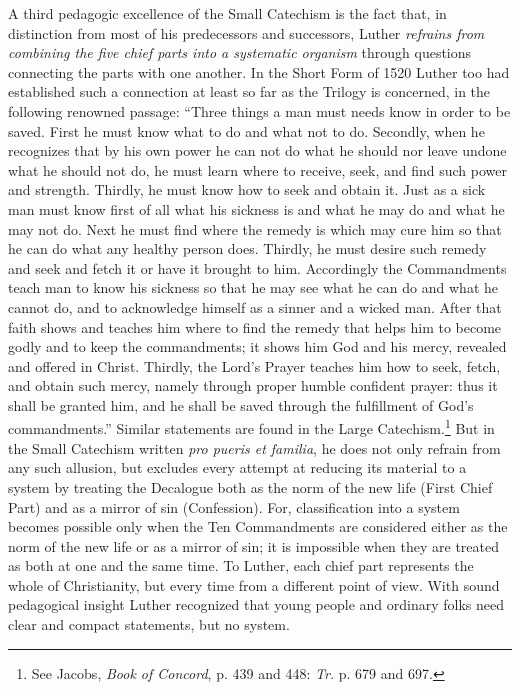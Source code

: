 A third pedagogic excellence of the Small Catechism is the fact that, in distinction from most of his predecessors and successors, Luther \emph{refrains from combining the five chief parts into a systematic organism} through questions connecting the parts with one another. In the Short Form of 1520 Luther too had established such a connection at least so far as the Trilogy is concerned, in the following renowned passage: “Three things a man must needs know in order to be saved. First he must know what to do and what not to do. Secondly, when he recognizes that by his own power he can not do what he should nor leave undone what he should not do, he must learn where to receive, seek, and find such power and strength. Thirdly, he must know how to seek and obtain it. Just as a sick man must know first of all what his sickness is and what he may do and what he may not do. Next he must find where the remedy is which may cure him so that he can do what any healthy person does.
Thirdly, he must desire such remedy and seek and fetch it or have it brought to him. Accordingly the Commandments teach man to know his sickness so that he may see what he can do and what he cannot do, and to acknowledge himself as a sinner and a wicked man. After that faith shows and teaches him where to find the remedy that helps him to become godly and to keep the commandments; it shows him God and his mercy, revealed and offered in Christ. Thirdly, the Lord’s Prayer teaches him how to seek, fetch, and obtain such mercy, namely through proper humble confident prayer: thus it shall be granted him, and he shall be saved through the fulfillment of God’s commandments.” Similar statements are found in the Large Catechism.\footnote{See Jacobs, \emph{Book of Concord}, p. 439 and 448: \emph{Tr.} p. 679 and 697.} But in the Small Catechism written \emph{pro pueris et familia}, he does not only refrain from any such allusion, but excludes every attempt at reducing its material to a system by treating the Decalogue both as the norm of the new life (First Chief Part) and as a mirror of sin (Confession). For, classification into a system becomes possible only when the Ten Commandments are considered either as the norm of the new life or as a mirror of sin; it is impossible when they are treated as both at one and the same time. To Luther, each chief part represents the whole of Christianity, but every time from a different point of view. With sound pedagogical insight Luther recognized that young people and ordinary folks need clear and compact statements, but no system.

